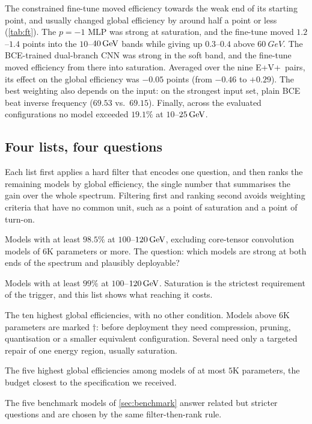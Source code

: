 \begin{table}[ht]
  \centering
  \caption{Matched before/after constrained fine-tuning (FT). Efficiencies [\%] by true-$\pT$ band [GeV]; red denotes a deficit to the baseline. Names and pretraining suffixes: \cref{tab:naming}.}
  \label{tab:ft}
  \small
  \setlength{\tabcolsep}{4pt}
  
\end{table}

The constrained fine-tune moved efficiency towards the weak end of its starting point, and usually changed global efficiency by around half a point or less (\cref{tab:ft}). The $p=-1$ MLP was strong at saturation, and the fine-tune moved $1.2$--$1.4$ points into the $10$--$40\,\mathrm{GeV}$ bands while giving up $0.3$--$0.4$ above $\SI{60}{GeV}$. The BCE-trained dual-branch CNN was strong in the soft band, and the fine-tune moved efficiency from there into saturation. Averaged over the nine E+V+\Ffeat\ pairs, its effect on the global efficiency was $-0.05$ points (from $-0.46$ to $+0.29$). The best weighting also depends on the input: on the strongest input set, plain BCE beat inverse frequency ($69.53$ vs.\ $69.15$). Finally, across the evaluated configurations no model exceeded $19.1\%$ at $10$--$25\,\mathrm{GeV}$.

\subsection{Four lists, four questions}
Each list first applies a hard filter that encodes one question, and then ranks the remaining models by global efficiency, the single number that summarises the gain over the whole spectrum. Filtering first and ranking second avoids weighting criteria that have no common unit, such as a point of saturation and a point of turn-on.
\begin{description}[leftmargin=0pt,itemsep=2pt]
  \item[Balanced leaders (\cref{tab:lb_balanced}).] Models with at least $98.5\%$ at $100$--$120\,\mathrm{GeV}$, excluding core-tensor convolution models of $6$K parameters or more. The question: which models are strong at both ends of the spectrum and plausibly deployable?
  \item[Plateau experts (\cref{tab:lb_plateau}).] Models with at least $99\%$ at $100$--$120\,\mathrm{GeV}$. Saturation is the strictest requirement of the trigger, and this list shows what reaching it costs.
  \item[Most promising (\cref{tab:lb_top}).] The ten highest global efficiencies, with no other condition. Models above $6$K parameters are marked $\dagger$: before deployment they need compression, pruning, quantisation or a smaller equivalent configuration. Several need only a targeted repair of one energy region, usually saturation.
  \item[Within budget (\cref{tab:lb_budget}).] The five highest global efficiencies among models of at most $5$K parameters, the budget closest to the specification we received.
\end{description}
The five benchmark models of \cref{sec:benchmark} answer related but stricter questions and are chosen by the same filter-then-rank rule.

